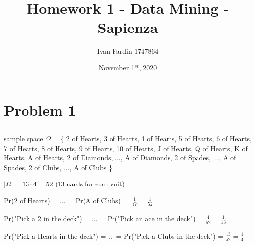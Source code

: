 \documentclass[11pt]{article}
\begin{document}
\title{Homework 1 - Data Mining - Sapienza}
\author{Ivan Fardin 1747864}
\date{November 1$^{st}$, 2020}

\maketitle

\tableofcontents

\newpage
\section{Problem 1}

\subsection{}
sample space $\Omega$ = \{ \newline
                \hspace*{1cm}   2 of Hearts, 3 of Hearts, 4 of Hearts, 5 of Hearts, 6 of Hearts, 7 of Hearts, 8 of Hearts, 9 of Hearts, \newline
                \hspace*{1cm}   10 of Hearts, J of Hearts, Q of Hearts, K of Hearts, A of Hearts, \newline
                \hspace*{1cm}   2 of Diamonds, ..., A of Diamonds, \newline
                \hspace*{1cm}   2 of Spades, ..., A of Spades, \newline
                \hspace*{1cm}   2 of Clubs, ..., A of Clubs \}

\bigskip
\noindent
$ \displaystyle |\Omega| = 13 \cdot 4 = 52$    \hspace{1cm} (13 cards for each suit)

\bigskip
\noindent
Pr(2 of Hearts) = ... = Pr(A of Clubs) = $ \displaystyle \frac{1}{|\Omega|} = \frac{1}{52}$

\bigskip
\noindent
Pr("Pick a 2 in the deck") = ... = Pr("Pick an ace in the deck") = $ \displaystyle \frac{4}{52} = \frac{1}{13}$

\bigskip
\noindent
Pr("Pick a Hearts in the deck") = ... = Pr("Pick a Clubs in the deck") = $ \displaystyle \frac{13}{52} = \frac{1}{4}$

\subsection{}
\end{document}
